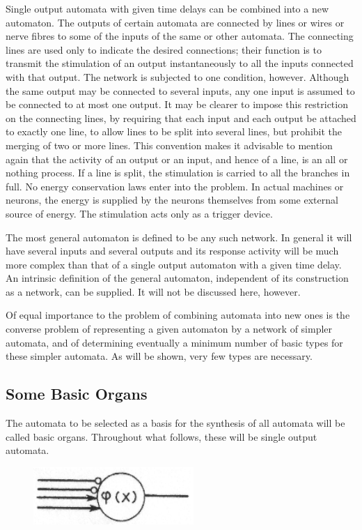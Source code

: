 \documentclass[twocolumn,preprintnumbers,amsmath,amssymb,floatfix]{revtex4}
\begin{document}
Single output automata with given time delays can be combined into
a new automaton. The outputs of certain automata are connected by
lines or wires or nerve fibres to some of the inputs of the same
or other automata. The connecting lines are used only to indicate
the desired connections; their function is to transmit the
stimulation of an output instantaneously to all the inputs
connected with that output. The network is subjected to one
condition, however. Although the same output may be connected to
several inputs, any one input is assumed to be connected to at
most one output. It may be clearer to impose this restriction on
the connecting lines, by requiring that each input and each output
be attached to exactly one line, to allow lines to be split into
several lines, but prohibit the merging of two or more lines. This
convention makes it advisable to mention again that the activity
of an output or an input, and hence of a line, is an all or
nothing process. If a line is split, the stimulation is carried to
all the branches in full. No energy conservation laws enter into
the problem. In actual machines or neurons, the energy is supplied
by the neurons themselves from some external source of energy. The
stimulation acts only as a trigger device.

The most general automaton is defined to be any such network. In
general it will have several inputs and several outputs and its
response activity will be much more complex than that of a single
output automaton with a given time delay. An intrinsic definition
of the general automaton, independent of its construction as a
network, can be supplied. It will not be discussed here, however.

Of equal importance to the problem of combining automata into new
ones is the converse problem of representing a given automaton by
a network of simpler automata, and of determining eventually a
minimum number of basic types for these simpler automata. As will
be shown, very few types are necessary.

\subsection{\label{sec:two3}Some Basic Organs}

The automata to be selected as a basis for the synthesis of all
automata will be called basic organs. Throughout what follows,
these will be single output automata.

\begin{figure}
\includegraphics[width=2.4in]{fig_1}
\caption{\label{fig:1}}
\end{figure}
\end{document}

